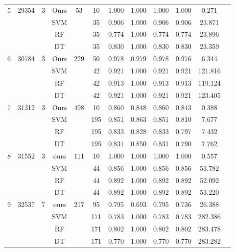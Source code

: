 \begin{table}[htbp]
\begin{tabular}{cccccccccccc}
        \midrule
        5  & 29354 & 3 & Ours & 53  & 10  & 1.000 & 1.000 & 1.000 & 1.000 & 0.271 \\
           &       &   & SVM  &     & 35  & 0.906 & 1.000 & 0.906 & 0.906 & 23.871 \\
           &       &   & RF   &     & 35  & 0.774 & 1.000 & 0.774 & 0.774 & 23.896 \\
           &       &   & DT   &     & 35  & 0.830 & 1.000 & 0.830 & 0.830 & 23.359 \\
        \midrule
        6  & 30784 & 3 & Ours & 229 & 50  & 0.978 & 0.979 & 0.978 & 0.976 & 6.344 \\
           &       &   & SVM  &     & 42  & 0.921 & 1.000 & 0.921 & 0.921 & 121.816 \\
           &       &   & RF   &     & 42  & 0.913 & 1.000 & 0.913 & 0.913 & 119.124 \\
           &       &   & DT   &     & 42  & 0.921 & 1.000 & 0.921 & 0.921 & 123.405 \\
        \midrule
        7  & 31312 & 3 & Ours & 498 & 10  & 0.860 & 0.848 & 0.860 & 0.843 & 0.388 \\
           &       &   & SVM  &     & 195 & 0.851 & 0.863 & 0.851 & 0.810 & 7.677 \\
           &       &   & RF   &     & 195 & 0.833 & 0.828 & 0.833 & 0.797 & 7.432 \\
           &       &   & DT   &     & 195 & 0.831 & 0.850 & 0.831 & 0.790 & 7.762 \\
        \midrule
        8  & 31552 & 3 & ours & 111 & 10  & 1.000 & 1.000 & 1.000 & 1.000 & 0.557 \\
           &       &   & SVM  &     & 44  & 0.856 & 1.000 & 0.856 & 0.856 & 53.782 \\
           &       &   & RF   &     & 44  & 0.892 & 1.000 & 0.892 & 0.892 & 52.092 \\
           &       &   & DT   &     & 44  & 0.892 & 1.000 & 0.892 & 0.892 & 53.220 \\
        \midrule
        9  & 32537 & 7 & ours & 217 & 95  & 0.795 & 0.693 & 0.795 & 0.736 & 26.388 \\
           &       &   & SVM  &     & 171 & 0.783 & 1.000 & 0.783 & 0.783 & 282.386 \\
           &       &   & RF   &     & 171 & 0.802 & 1.000 & 0.802 & 0.802 & 283.478 \\
           &       &   & DT   &     & 171 & 0.770 & 1.000 & 0.770 & 0.770 & 283.282 \\

\end{tabular}
\end{table}
